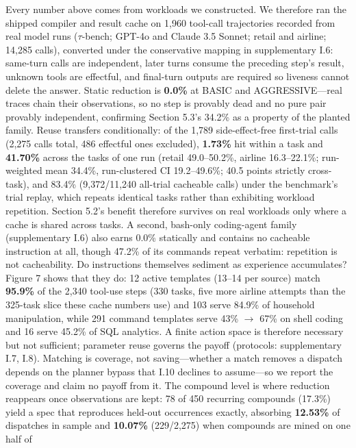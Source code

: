 \documentclass[
  sigconf,
  anonymous]{acmart}
\begin{document}
Every number above comes from workloads we constructed. We therefore ran
the shipped compiler and result cache on 1,960 tool-call trajectories
recorded from real model runs (\(\tau\)-bench; GPT-4o and Claude 3.5
Sonnet; retail and airline; 14,285 calls), converted under the
conservative mapping in supplementary I.6: same-turn calls are
independent, later turns consume the preceding step's result, unknown
tools are effectful, and final-turn outputs are required so liveness
cannot delete the answer. Static reduction is \textbf{0.0\%} at BASIC
and AGGRESSIVE---real traces chain their observations, so no step is
provably dead and no pure pair provably independent, confirming Section
5.3's 34.2\% as a property of the planted family. Reuse transfers
conditionally: of the 1,789 side-effect-free first-trial calls (2,275
calls total, 486 effectful ones excluded), \textbf{1.73\%} hit within a
task and \textbf{41.70\%} across the tasks of one run (retail
49.0--50.2\%, airline 16.3--22.1\%; run-weighted mean 34.4\%,
run-clustered CI 19.2--49.6\%; 40.5 points strictly cross-task), and
83.4\% (9,372/11,240 all-trial cacheable calls) under the benchmark's
trial replay, which repeats identical tasks rather than exhibiting
workload repetition. Section 5.2's benefit therefore survives on real
workloads only where a cache is shared across tasks. A second, bash-only
coding-agent family (supplementary I.6) also earns 0.0\% statically and
contains no cacheable instruction at all, though 47.2\% of its commands
repeat verbatim: repetition is not cacheability. Do instructions
themselves sediment as experience accumulates? Figure 7 shows that they
do: 12 active templates (13--14 per source) match \textbf{95.9\%} of the
2,340 tool-use steps (330 tasks, five more airline attempts than the
325-task slice these cache numbers use) and 103 serve 84.9\% of
household manipulation, while 291 command templates serve 43\%
\(\rightarrow\) 67\% on shell coding and 16 serve 45.2\% of SQL
analytics. A finite action space is therefore necessary but not
sufficient; parameter reuse governs the payoff (protocols: supplementary
I.7, I.8). Matching is coverage, not saving---whether a match removes a
dispatch depends on the planner bypass that I.10 declines to assume---so
we report the coverage and claim no payoff from it. The compound level
is where reduction reappears once observations are kept: 78 of 450
recurring compounds (17.3\%) yield a spec that reproduces held-out
occurrences exactly, absorbing \textbf{12.53\%} of dispatches in sample
and \textbf{10.07\%} (229/2,275) when compounds are mined on one half of
\end{document}
